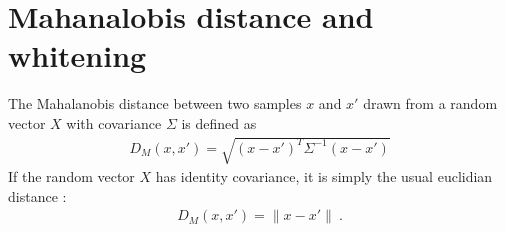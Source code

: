 \documentclass{article} %
\begin{document}





{}

\newpage

\appendix

\section{Mahanalobis distance and whitening}

The Mahalanobis distance \citep{chandra1936generalised, mclachlan1999mahalanobis} between two samples $x$ and $x'$ drawn from a random vector $X$ with covariance $\Sigma$ is defined as  
\begin{align*} D_M (x, x' ) =  \sqrt{ (x - x')^T \Sigma^{-1} (x - x')} \end{align*}
If the random vector $X$ has identity covariance, it is simply the usual euclidian distance : 
\begin{align*} D_M (x, x' ) =  \| x - x' \| \ .\end{align*}
\end{document}
